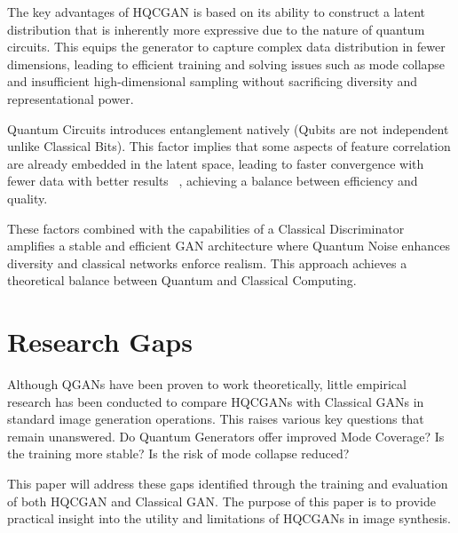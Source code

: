 The key advantages of HQCGAN is based on its ability to construct a latent distribution that is inherently more expressive due to the nature of quantum circuits. This equips the generator to capture complex data distribution in fewer dimensions, leading to efficient training and solving issues such as mode collapse and insufficient high-dimensional sampling without sacrificing diversity and representational power.

Quantum Circuits introduces entanglement natively (Qubits are not independent unlike Classical Bits). This factor implies that some aspects of feature correlation are already embedded in the latent space, leading to faster convergence with fewer data with better results ~\cite{lloyd2018qgan}, achieving a balance between efficiency and quality.

These factors combined with the capabilities of a Classical Discriminator amplifies a stable and efficient GAN architecture where Quantum Noise enhances diversity and classical networks enforce realism. This approach achieves a theoretical balance between Quantum and Classical Computing.
\section{Research Gaps}

Although QGANs have been proven to work theoretically, little empirical research has been conducted to compare HQCGANs with Classical GANs in standard image generation operations. This raises various key questions that remain unanswered. Do Quantum Generators offer improved Mode Coverage? Is the training more stable? Is the risk of mode collapse reduced?

This paper will address these gaps identified through the training and evaluation of both HQCGAN and Classical GAN. The purpose of this paper is to provide practical insight into the utility and limitations of HQCGANs in image synthesis.